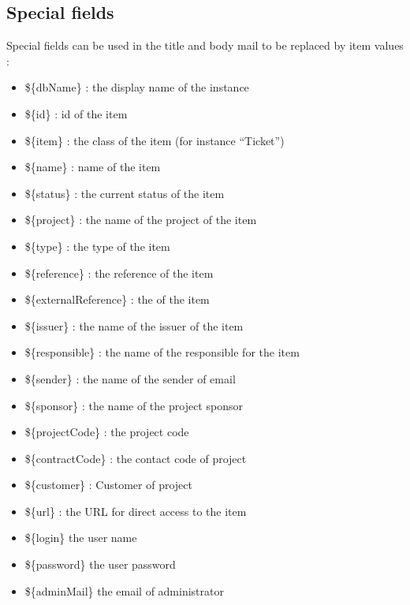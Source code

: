 \documentclass[letterpaper,10pt,english]{sphinxmanual}
\begin{document}
\subsection{Special fields}
\label{Administration:administration-special-field-label}\label{Administration:special-fields}\label{Administration:index-3}
Special fields can be used in the title and body mail to be replaced by item values :
\begin{itemize}
\item {} 
\$\{dbName\} : the display name of the instance

\item {} 
\$\{id\} : id of the item

\item {} 
\$\{item\} : the class of the item (for instance ``Ticket'')

\item {} 
\$\{name\} : name of the item

\item {} 
\$\{status\} : the current status of the item

\item {} 
\$\{project\} : the name of the project of the item

\item {} 
\$\{type\} : the type of the item

\item {} 
\$\{reference\} : the reference of the item

\item {} 
\$\{externalReference\} : the {\hyperref[Glossary:term-external-reference]{\emph{}}} of the item

\item {} 
\$\{issuer\} : the name of the issuer of the item

\item {} 
\$\{responsible\}  : the name of the responsible for the item

\item {} 
\$\{sender\} : the name of the sender of email

\item {} 
\$\{sponsor\} : the name of the project sponsor

\item {} 
\$\{projectCode\} : the project code

\item {} 
\$\{contractCode\} : the contact code of project

\item {} 
\$\{customer\} : Customer of project

\item {} 
\$\{url\} : the URL for direct access to the item

\item {} 
\$\{login\} the user name

\item {} 
\$\{password\} the user password

\item {} 
\$\{adminMail\} the email of administrator

\end{itemize}
\end{document}
